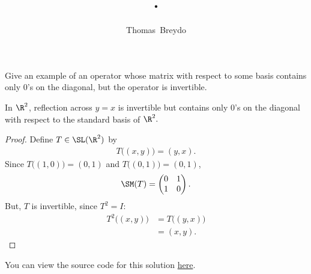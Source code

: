 \documentclass{amsart}
\title{\pagenum.\probnum}
\author{Thomas\ Breydo}
\newcommand{\pagenum}{154}
\newcommand{\probnum}{14}
\begin{document}
\maketitle

\begin{problem*}
Give an example of an operator whose matrix with respect to some basis
contains only $0$'s on the diagonal, but the operator is invertible.
\end{problem*}

\vspace{0.5in}

\begin{claim*}
    In $\R^2$, reflection across $y=x$ is invertible but contains
    only $0$'s on the diagonal with respect to the standard basis
    of $\R^2.$
\end{claim*}
\begin{proof}
Define $T\in\SL(\R^2)$ by
\begin{align*}
    T\big((x, y)\big)=(y,x).
\end{align*}
Since $T\big((1,0)\big)=(0,1)$ and $T\big((0,1)\big)=(0,1)$,
\begin{align*}
    \SM(T)=\begin{pmatrix}
        0 & 1 \\
        1 & 0
    \end{pmatrix}.
\end{align*}
But, $T$ is invertible, since $T^2=I$:
\begin{align*}
    T^2\big((x,y)\big)&=T\big((y,x)\big)\\
                      &=(x,y).
\end{align*}
\end{proof}

\vspace{0.5in}

\begin{note*}
You can view the source code for this solution
\href{https://github.com/thomasbreydo/linalg/blob/main/\pagenum_\probnum_Thomas_Breydo.tex}
{here}.
\end{note*}
\end{document}
